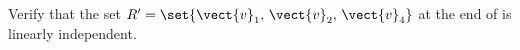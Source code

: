 Verify that the set $R^\prime=\set{\vect{v}_1,\,\vect{v}_2,\,\vect{v}_4}$ at the end of  is linearly independent.